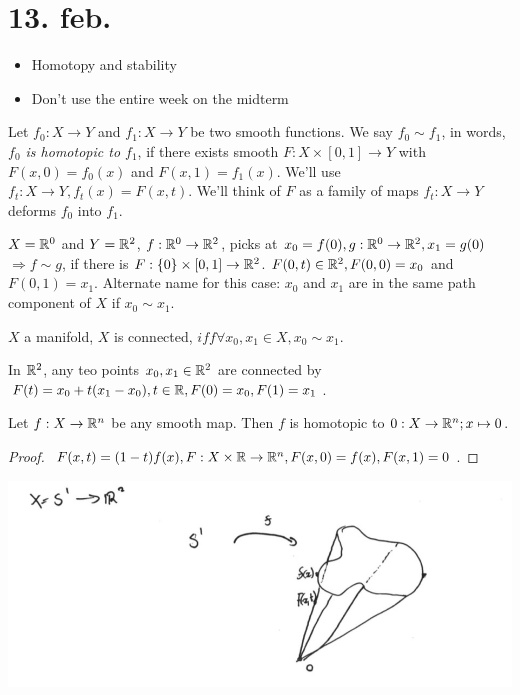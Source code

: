 \section{13. feb.}
\begin{itemize}
  \item Homotopy and stability
  \item Don't use the entire week on the midterm
\end{itemize}
\begin{definition}
  Let $f_0 : X\to Y$ and $f_1: X\to Y$ be two smooth functions. We say $f_0 \sim f_1$, in words, \emph{$f_0$ is homotopic to $f_1$}, if there exists smooth $F: X \times [0,1] \to Y$ with $F(x,0)=f_0(x)$ and $F(x,1)=f_1(x)$. We'll use $f_t : X\to Y, f_t(x)=F(x,t)$. We'll think of $F$ as a family of maps $f_t : X\to Y$ deforms $f_0 $ into $f_1$.
\end{definition}
\begin{example}
  $X=\mathbb{R}^0$ and $Y=\mathbb{R}^2$, $f: \mathbb{R}^0 \to \mathbb{R}^2$, picks at $x_0 = f(0), g: \mathbb{R}^0 \to \mathbb{R}^2, x_1=g(0)$
  \newline $\Rightarrow f\sim g$, if there is $F:\{0\} \times [0,1] \to \mathbb{R}^2$.
  \newline $F(0,t)\in \mathbb{R}^2, F(0,0)=x_0$ and $F(0,1)=x_1$. Alternate name for this case: $x_0$ and $x_1$ are in the same path component of $X$ if $x_0 \sim x_1$.
\end{example}
\begin{exercise}
      $X$ a manifold, $X$ is connected, $iff \forall x_0,x_1 \in X, x_0 \sim x_1$.
\end{exercise}
In $\mathbb{R}^2$, any teo points $x_0, x_1 \in \mathbb{R}^2$ are connected by $F(t)=x_0+t(x_1-x_0), t\in \mathbb{R}, F(0)=x_0, F(1)=x_1$.
\begin{proposition}
  Let $f: X\to \mathbb{R}^n$ be any smooth map. Then $f$ is homotopic to $0: X \to \mathbb{R}^n; x\mapsto 0$.
\end{proposition}
\begin{proof}
  $F(x,t)=(1-t)f(x), F: X\times \mathbb{R} \to \mathbb{R}^n, F(x,0)=f(x), F(x,1)=0$.
\end{proof}
\begin{center}
      \includegraphics[width=0.30\paperwidth]{difftop/week06/s1toR2}
\end{center}

